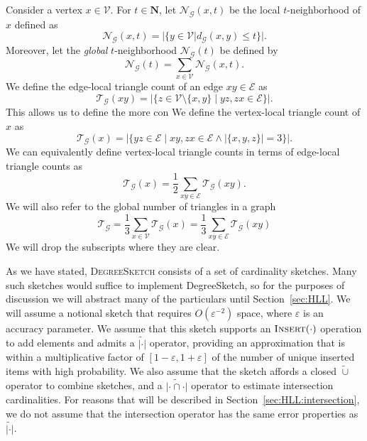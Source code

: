 \documentclass{vldb}
\newcommand{\algoname}[1]{\textnormal{\textsc{#1}}}
\begin{document}
Consider a vertex $x \in \mathcal{V}$.
For $t \in \mathbf{N}$, let $\mathcal{N}_\mathcal{G}(x, t)$ be the local $t$-neighborhood of $x$ defined as 
%
\begin{equation} \label{eq:func:nbhd:local}
	\mathcal{N}_\mathcal{G}(x, t) = |\{y \in \mathcal{V} | d_\mathcal{G}(x, y) \leq t\}|.
\end{equation}
Moreover, let the \emph{global} $t$-neighborhood $\mathcal{N}_\mathcal{G}(t)$ be defined by 
%
\begin{equation} \label{eq:func:nbhd:sum}
	\mathcal{N}_\mathcal{G}(t) = \sum_{x \in \mathcal{V}} \mathcal{N}_\mathcal{G}(x, t).
\end{equation}
%
We define the edge-local triangle count of an edge $xy \in \mathcal{E}$ as
%
\begin{equation}
	\mathcal{T}_\mathcal{G}(xy) = |\{z \in \mathcal{V} \setminus \{x,y\} \mid yz, zx \in \mathcal{E}\}|.
\end{equation}
This allows us to define the more con
We define the vertex-local triangle count of $x$ as
%
\begin{equation}
	\mathcal{T}_\mathcal{G}(x) = |\{yz \in \mathcal{E} \mid xy, zx \in \mathcal{E} \wedge |\{x, y, z\}| = 3\}|.
\end{equation}
%
We can equivalently define vertex-local triangle counts in terms of edge-local triangle counts as
%
\begin{equation} \label{eq:sum_of_edge_tris}
	\mathcal{T}_\mathcal{G}(x) 
	= \frac{1}{2}\sum\limits_{xy \in \mathcal{E}} \mathcal{T}_\mathcal{G}(xy).
\end{equation}
%
%
We will also refer to the global number of triangles in a graph 
%
\begin{equation} \label{eq:global_tris}
	\mathcal{T}_\mathcal{G} 
	= \frac{1}{3}\sum_{x \in \mathcal{V}} \mathcal{T}_\mathcal{G}(x)
	= \frac{1}{3}\sum_{xy \in \mathcal{E}} \mathcal{T}_\mathcal{G}(xy)
\end{equation}
%
We will drop the subscripts where they are clear.


As we have stated, \algoname{DegreeSketch} consists of a set of cardinality sketches.
Many such sketches would suffice to implement DegreeSketch, so for the purposes of discussion we will abstract many of the particulars until Section~\ref{sec:HLL}.
We will assume a notional sketch that requires $O(\varepsilon^{-2})$ space, where $\varepsilon$ is an accuracy parameter.
We assume that this sketch supports an $\algoname{Insert}(\cdot)$ operation to add elements and admits a $\widetilde{| \cdot |}$ operator, providing an approximation that is within a multiplicative factor of $[1-\varepsilon, 1+\varepsilon]$ of the number of unique inserted items with high probability.
We also assume that the sketch affords a closed $\widetilde{\cup}$ operator to combine sketches, and a $\widetilde{| \cdot \cap \cdot |}$ operator to estimate intersection cardinalities.
For reasons that will be described in Section~\ref{sec:HLL:intersection}, we do not assume that the intersection operator has the same error properties as $\widetilde{| \cdot |}$.
\end{document}

